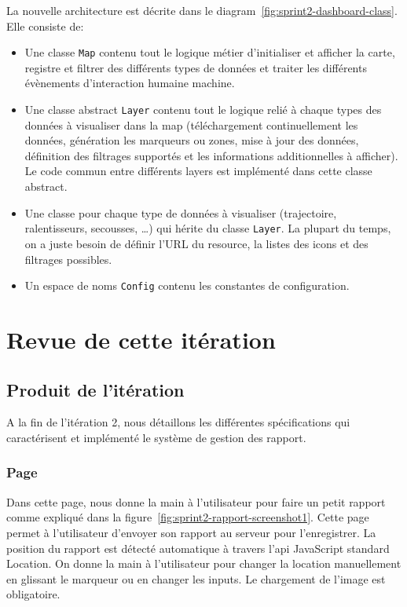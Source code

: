 La nouvelle architecture est décrite dans le
diagram~\ref{fig:sprint2-dashboard-class}. Elle consiste de:

\begin{itemize}
    \item Une classe \verb|Map| contenu tout le logique métier d'initialiser et
        afficher la carte, registre et filtrer des différents types de données
        et traiter les différents évènements d'interaction humaine machine.
    \item Une classe abstract \verb|Layer| contenu tout le logique relié à
        chaque types des données à visualiser dans la map (téléchargement
        continuellement les données, génération les marqueurs ou zones, mise à
        jour des données, définition des filtrages supportés et les
        informations additionnelles à afficher). Le code commun entre
        différents layers est implémenté dans cette classe abstract.
    \item Une classe pour chaque type de données à visualiser (trajectoire,
        ralentisseurs, secousses, \ldots) qui hérite du classe \verb|Layer|. La
        plupart du temps, on a juste besoin de définir l'URL du resource, la
        listes des icons et des filtrages possibles.
    \item Un espace de noms \verb|Config| contenu les constantes de
        configuration.
\end{itemize}

\section{Revue de cette itération}

\subsection{Produit de l'itération}

A la fin de l'itération 2, nous détaillons les différentes spécifications qui
caractérisent et implémenté le système de gestion des rapport.

\subsubsection{Page }

Dans cette page, nous donne la main à l'utilisateur pour faire un petit rapport
comme expliqué dans la figure~\ref{fig:sprint2-rapport-screenshot1}. Cette page
permet à l'utilisateur d'envoyer son rapport au serveur pour l'enregistrer. La
position du rapport est détecté automatique à travers l'api JavaScript standard
Location. On donne la main à l'utilisateur pour changer la location
manuellement en glissant le marqueur ou en changer les inputs. Le chargement de
l'image est obligatoire.

